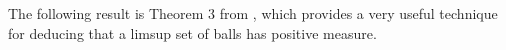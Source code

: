 \documentclass[12pt]{article}
\begin{document}
The following result is Theorem 3 from \cite{Velanipaper}, which provides a very useful technique for deducing that a limsup set of balls has positive measure.





\end{document}
